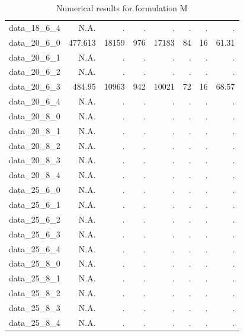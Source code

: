 \documentclass[preprint,12pt,authoryear]{elsarticle}
\begin{document}
\begin{table}[h!]
{\begin{tabular}{rrrrrrrr}
  data\_18\_6\_4 & N.A. & . & . & . & . & . & . \\
  data\_20\_6\_0 & 477.613 & 18159 & 976 & 17183 & 84 & 16 & 61.31 \\
  data\_20\_6\_1 & N.A. & . & . & . & . & . & . \\
  data\_20\_6\_2 & N.A. & . & . & . & . & . & . \\
  data\_20\_6\_3 & 484.95 & 10963 & 942 & 10021 & 72 & 16 & 68.57 \\
  data\_20\_6\_4 & N.A. & . & . & . & . & . & . \\
  data\_20\_8\_0 & N.A. & . & . & . & . & . & . \\
  data\_20\_8\_1 & N.A. & . & . & . & . & . & . \\
  data\_20\_8\_2 & N.A. & . & . & . & . & . & . \\
  data\_20\_8\_3 & N.A. & . & . & . & . & . & . \\
  data\_20\_8\_4 & N.A. & . & . & . & . & . & . \\
  data\_25\_6\_0 & N.A. & . & . & . & . & . & . \\
  data\_25\_6\_1 & N.A. & . & . & . & . & . & . \\
  data\_25\_6\_2 & N.A. & . & . & . & . & . & . \\
  data\_25\_6\_3 & N.A. & . & . & . & . & . & . \\
  data\_25\_6\_4 & N.A. & . & . & . & . & . & . \\
  data\_25\_8\_0 & N.A. & . & . & . & . & . & . \\
  data\_25\_8\_1 & N.A. & . & . & . & . & . & . \\
  data\_25\_8\_2 & N.A. & . & . & . & . & . & . \\
  data\_25\_8\_3 & N.A. & . & . & . & . & . & . \\
  data\_25\_8\_4 & N.A. & . & . & . & . & . & . \\
  \hline
\end{tabular}
        }
        \caption{Numerical results for formulation M}
    \label{tab:M_results}
\end{table}
\end{document}
